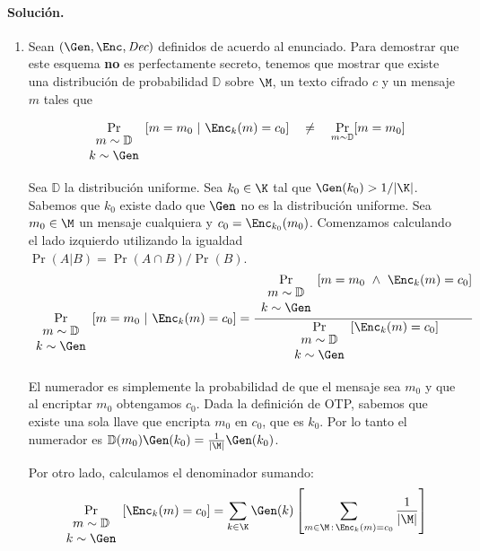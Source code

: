 \paragraph{Solución.} 
\begin{enumerate}
  \item
    Sean $(\Gen, \Enc, \textit{Dec})$ definidos de acuerdo al enunciado. Para demostrar que este esquema \textbf{no} es perfectamente secreto, tenemos que mostrar que existe una distribución de probabilidad $\mathbb{D}$ sobre $\M$, un texto cifrado $c$ y un mensaje $m$ tales que

    $$\underset{ \begin{array}{cc} m\sim\mathbb{D}\\ k\sim\Gen \end{array} } {\Pr}[m=m_0\ |\ \Enc_k(m)=c_0]\quad \neq \quad \underset{m\sim \mathbb{D}} {\Pr}[m=m_0] $$

    Sea $\mathbb{D}$ la distribución uniforme. Sea $k_0\in\K$ tal que $\Gen(k_0) > 1/|\K|$. Sabemos que $k_0$ existe dado que $\Gen$ no es la distribución uniforme. Sea $m_0\in\M$ un mensaje cualquiera y $c_0=\Enc_{k_0}(m_0)$. Comenzamos calculando el lado izquierdo utilizando la igualdad $\Pr(A|B)=\Pr(A\cap B)/\Pr(B)$.
    $$\underset{ \begin{array}{cc} m\sim\mathbb{D}\\ k\sim\Gen \end{array} } {\Pr}[m=m_0\ |\ \Enc_k(m)=c_0] = \frac{\underset{ \begin{array}{cc} m\sim\mathbb{D}\\ k\sim\Gen \end{array} } {\Pr}[m=m_0\ \land \ \Enc_k(m)=c_0]}{\underset{ \begin{array}{cc} m\sim\mathbb{D}\\ k\sim\Gen \end{array} } {\Pr}[\Enc_k(m)=c_0]}$$

    El numerador es simplemente la probabilidad de que el mensaje sea $m_0$ y que al encriptar $m_0$ obtengamos $c_0$. Dada la definición de OTP, sabemos que existe una sola llave que encripta $m_0$ en $c_0$, que es $k_0$. Por lo tanto el numerador es $\mathbb{D}(m_0)\Gen(k_0)=\frac{1}{|\M|}\Gen(k_0)$.

    Por otro lado, calculamos el denominador sumando:
    $$\underset{ \begin{array}{cc} m\sim\mathbb{D}\\ k\sim\Gen \end{array} } {\Pr}[\Enc_k(m)=c_0]=\sum_{k\in\K}\Gen(k)\left[\sum_{m\in\M \, : \, \Enc_k(m)=c_0} \frac{1}{|\M|}\right]$$


\end{enumerate}
